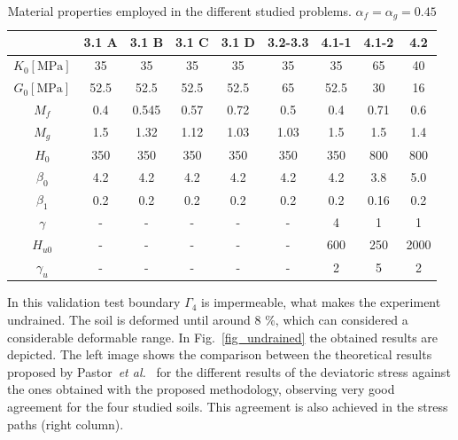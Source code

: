 \documentclass[preprint,12pt,a4paper]{elsarticle}
\begin{document}
\begin{table}
\caption{\label{tab3} Material properties employed in the different studied problems. $\alpha_f=\alpha_g=0.45$} 
\centering
	\begin{tabular}{c|c|c|c|c|c|c|c|c}
	& 3.1 A  & 3.1 B & 3.1 C & 3.1 D & 3.2-3.3 & 4.1-1 & 4.1-2 & 4.2 \\
	\hline
        $K_{0} \left[ \text{MPa} \right]$  & 35 & 35 & 35 & 35 & 35 & 35 & 65 & 40
        \\ 
        $G_{0} \left[ \text{MPa} \right]$ & 52.5 & 52.5 & 52.5 & 52.5 & 65 & 52.5 & 30 & 16
        \\
        \(M_{f}\)  & 0.4 & 0.545 & 0.57 & 0.72 & 0.5 & 0.4 & 0.71 & 0.6
        \\
        \(M_{g}\) & 1.5 & 1.32 & 1.12 & 1.03 & 1.03 & 1.5 & 1.5 & 1.4
        \\
        \(H_{0}\) & 350 & 350 & 350 & 350 & 350  & 350 & 800 & 800
        \\
        \(\beta_{0}\) & 4.2 & 4.2 & 4.2 & 4.2 & 4.2 & 4.2 & 3.8 & 5.0
        \\
        \(\beta_{1}\) & 0.2 & 0.2 & 0.2 & 0.2 & 0.2 & 0.2 & 0.16 & 0.2
        \\
        \( \gamma\)  & - & - & - & - & - & 4 & 1 & 1
        \\
        \(H_{u 0}\) & - & - & - & - & - & 600 & 250 & 2000
        \\
        \( \gamma_{u}\)  & - & - & - & - & - & 2 & 5 & 2
        \\
	\end{tabular}
\end{table}

In this validation test boundary $\Gamma_4$ is impermeable, what makes the experiment undrained. The soil is deformed until around 8 \%, which can considered a considerable deformable range. In Fig.~\ref{fig_undrained} the obtained results are depicted. The left image shows the comparison between the theoretical results proposed by Pastor~\textit{et al.}~\cite{PastorZC:90} for the different results of the deviatoric stress against the ones obtained with the proposed methodology, observing very good agreement for the four studied soils. This agreement is also achieved in the stress paths (right column).
\end{document}
